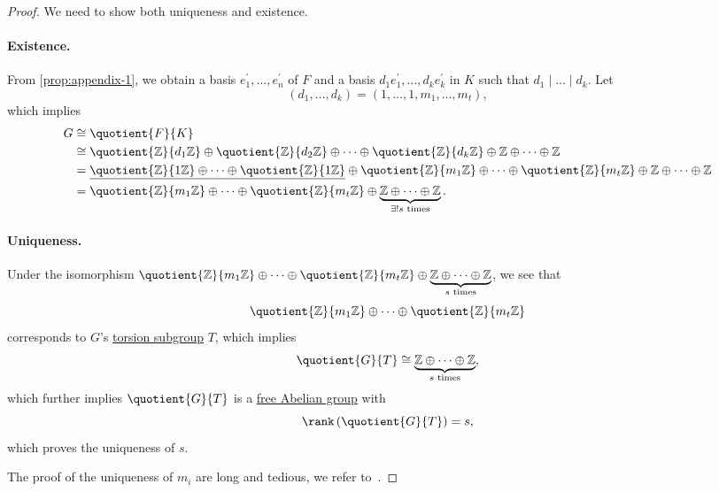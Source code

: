 \begin{proof}
	We need to show both uniqueness and existence.
	\paragraph{Existence.} From \autoref{prop:appendix-1}, we obtain a basis \(e_1^\prime , \dots , e_{n} ^\prime\) of \(F\) and a basis \(d_1 e_1^\prime , \dots , d_{k} e_{k} ^\prime\) in \(K\)
	such that \(d_1\mid \dots \mid d_k \). Let
	\[
		(d_1, \dots , d_{k}) = (1, \dots , 1, m_1, \dots , m_{t}),
	\]
	which implies
	\[
		\begin{split}
			G & \cong \quotient{F}{K}                                                                                                                                                                                                                                                        \\
			  & \cong \quotient{\mathbb{Z} }{d_1 \mathbb{Z} } \oplus \quotient{\mathbb{Z} }{d_2 \mathbb{Z} } \oplus \dots \oplus \quotient{\mathbb{Z} }{d_k \mathbb{Z} }  \oplus \mathbb{Z} \oplus \dots \oplus \mathbb{Z}                                                                   \\
			  & = \underline{\quotient{\mathbb{Z} }{1 \mathbb{Z} } \oplus \dots \oplus \quotient{\mathbb{Z} }{1 \mathbb{Z} }} \oplus\quotient{\mathbb{Z} }{m_1 \mathbb{Z} } \oplus \dots \oplus \quotient{\mathbb{Z} }{m_{t}  \mathbb{Z} }  \oplus \mathbb{Z} \oplus \dots \oplus \mathbb{Z} \\
			  & = \quotient{\mathbb{Z} }{m_1 \mathbb{Z} } \oplus \dots \oplus \quotient{\mathbb{Z} }{m_t \mathbb{Z} }  \oplus \underbrace{\mathbb{Z} \oplus \dots \oplus \mathbb{Z}  }_{\exists ! s \text{ times}}.
		\end{split}
	\]

	\paragraph{Uniqueness.} Under the isomorphism \(\quotient{\mathbb{Z} }{m_1 \mathbb{Z} } \oplus \dots \oplus \quotient{\mathbb{Z} }{m_t \mathbb{Z} }  \oplus \underbrace{\mathbb{Z} \oplus \dots \oplus \mathbb{Z}  }_{s \text{ times}}\),
	we see that
	\[
		\quotient{\mathbb{Z} }{m_1 \mathbb{Z} } \oplus \dots \oplus \quotient{\mathbb{Z} }{m_t \mathbb{Z} }
	\]
	corresponds to \(G\)'s \hyperref[def:torsion-subgroup]{torsion subgroup} \(T\), which implies
	\[
		\quotient{G}{T} \cong \underbrace{\mathbb{Z} \oplus \dots \oplus \mathbb{Z}  }_{\text{\(s\) times} },
	\]
	which further implies \(\quotient{G}{T} \) is a \hyperref[def:free-Abelian-group]{free Abelian group} with
	\[
		\rank \left( \quotient{G}{T} \right) = s,
	\]
	which proves the uniqueness of \(s\).

	The proof of the uniqueness of \(m_{i} \) are long and tedious, we refer to~\cite{armstrong2013basic}.
\end{proof}

